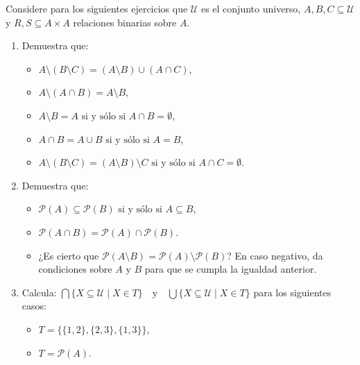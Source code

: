 \documentclass[11pt,answers]{exam}
\begin{document}


Considere para los siguientes ejercicios que $\mathscr{U}$ es el conjunto universo, \( A, B, C \subseteq \mathscr{U} \) y \( R, S \subseteq A \times A \) relaciones binarias sobre \( A \).

\begin{enumerate}
    \item Demuestra que:
    \begin{itemize}
        \item $A \setminus (B \setminus C) = (A \setminus B) \cup (A \cap C)$,
        \item $A \setminus (A \cap B) = A \setminus B$,
        \item $A \setminus B = A \text{ si y sólo si } A \cap B = \emptyset$,
        \item $A \cap B = A \cup B \text{ si y sólo si } A = B$,
        \item $A \setminus (B \setminus C) = (A \setminus B) \setminus C \text{ si y sólo si } A \cap C = \emptyset$.
    \end{itemize}

    

    \item Demuestra que:
    \begin{itemize}
        \item $\mathscr{P}(A) \subseteq \mathscr{P}(B) \text{ si y sólo si } A \subseteq B$,
        \item $\mathscr{P}(A \cap B) = \mathscr{P}(A) \cap \mathscr{P}(B)$.
        \item ¿Es cierto que \( \mathscr{P}(A \setminus B) = \mathscr{P}(A) \setminus \mathscr{P}(B) \)? En caso negativo, da condiciones sobre \( A \) y \( B \) para que se cumpla la igualdad anterior.
    \end{itemize}

    
    
    \item Calcula: \(\bigcap \{X \subseteq \mathscr{U} \mid X \in T\} \quad \text{y} \quad \bigcup \{X \subseteq \mathscr{U} \mid X \in T\}\)
    para los siguientes casos:
    \begin{itemize}
        \item \( T = \{\{1, 2\}, \{2, 3\}, \{1, 3\}\} \),
        \item \( T = \mathscr{P}(A) \).
    \end{itemize}

    


\end{enumerate}
\end{document}
